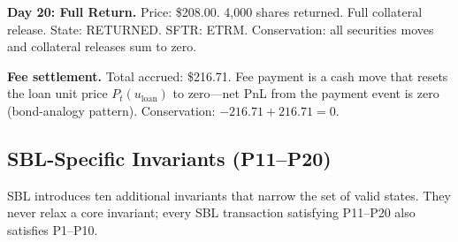 \documentclass[11pt,a4paper]{article}
\begin{document}
\medskip
\noindent\textbf{Day 20: Full Return.} Price: \$208.00. 4{,}000 shares returned. Full collateral release. State: RETURNED. SFTR: ETRM. Conservation: all securities moves and collateral releases sum to zero. \checkmark

\medskip
\noindent\textbf{Fee settlement.} Total accrued: \$216.71. Fee payment is a cash move that resets the loan unit price $P_t(u_{\mathrm{loan}})$ to zero---net PnL from the payment event is zero (bond-analogy pattern). Conservation: $-216.71 + 216.71 = 0$. \checkmark

\subsection{SBL-Specific Invariants (P11--P20)}
\label{sec:sbl-invariants}

SBL introduces ten additional invariants that narrow the set of valid states. They never relax a core invariant; every SBL transaction satisfying P11--P20 also satisfies P1--P10.
\end{document}
